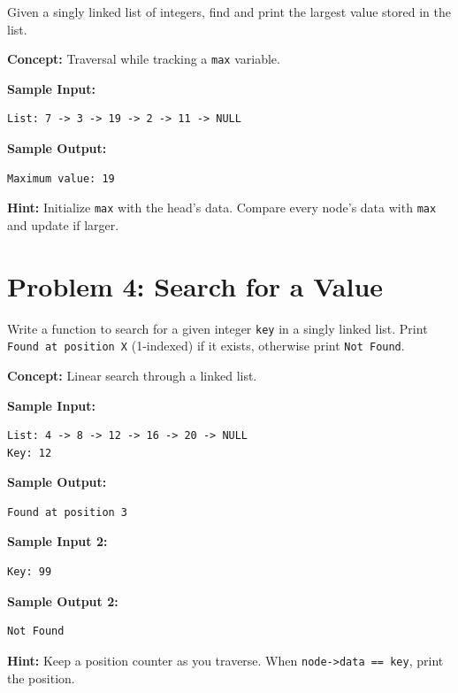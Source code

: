 \documentclass[12pt, a4paper]{article}
\begin{document}
\begin{problembox}
Given a singly linked list of integers, find and print the largest value stored in the list.
\end{problembox}

\textbf{Concept:} Traversal while tracking a \texttt{max} variable.

\textbf{Sample Input:}
\begin{lstlisting}
List: 7 -> 3 -> 19 -> 2 -> 11 -> NULL
\end{lstlisting}

\textbf{Sample Output:}
\begin{lstlisting}
Maximum value: 19
\end{lstlisting}

\textbf{Hint:} Initialize \texttt{max} with the head's data. Compare every node's data with \texttt{max} and update if larger.

\newpage

\section*{Problem 4: Search for a Value}

\begin{problembox}
Write a function to search for a given integer \texttt{key} in a singly linked list. Print \texttt{Found at position X} (1-indexed) if it exists, otherwise print \texttt{Not Found}.
\end{problembox}

\textbf{Concept:} Linear search through a linked list.

\textbf{Sample Input:}
\begin{lstlisting}
List: 4 -> 8 -> 12 -> 16 -> 20 -> NULL
Key: 12
\end{lstlisting}

\textbf{Sample Output:}
\begin{lstlisting}
Found at position 3
\end{lstlisting}

\textbf{Sample Input 2:}
\begin{lstlisting}
Key: 99
\end{lstlisting}
\textbf{Sample Output 2:}
\begin{lstlisting}
Not Found
\end{lstlisting}

\textbf{Hint:} Keep a position counter as you traverse. When \texttt{node->data == key}, print the position.
\end{document}
